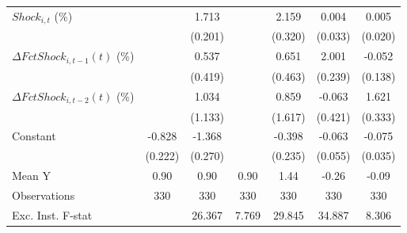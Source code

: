 {\begin{tabular}{l*{6}{c}}
\addlinespace
$ Shock_{i,t}$ (\%) &                     &       1.713\sym{***}&                     &       2.159\sym{***}&       0.004         &       0.005         \\
                    &                     &     (0.201)         &                     &     (0.320)         &     (0.033)         &     (0.020)         \\
\addlinespace
$ \Delta FctShock_{i,t-1}(t)$ (\%)&                     &       0.537         &                     &       0.651         &       2.001\sym{***}&      -0.052         \\
                    &                     &     (0.419)         &                     &     (0.463)         &     (0.239)         &     (0.138)         \\
\addlinespace
$ \Delta FctShock_{i,t-2}(t)$ (\%)&                     &       1.034         &                     &       0.859         &      -0.063         &       1.621\sym{***}\\
                    &                     &     (1.133)         &                     &     (1.617)         &     (0.421)         &     (0.333)         \\
\addlinespace
Constant            &      -0.828\sym{***}&      -1.368\sym{***}&                     &      -0.398         &      -0.063         &      -0.075\sym{**} \\
                    &     (0.222)         &     (0.270)         &                     &     (0.235)         &     (0.055)         &     (0.035)         \\
\midrule
Mean Y              &        0.90         &        0.90         &        0.90         &        1.44         &       -0.26         &       -0.09         \\
Observations        &         330         &         330         &         330         &         330         &         330         &         330         \\
Exc. Inst. F-stat   &                     &      26.367         &       7.769         &      29.845         &      34.887         &       8.306         \\
\bottomrule
\end{tabular}
}
